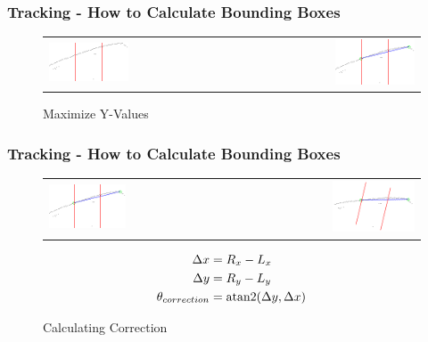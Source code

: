 \documentclass[nosymbols]{beamer}	%
\begin{document}
\begin{frame}
\frametitle{Tracking - How to Calculate Bounding Boxes}
\begin{figure}[!ht]
\caption{Maximize Y-Values}
\begin{tabular}{ l r }
 \includegraphics[width=0.45\textwidth,height=0.7\textheight,keepaspectratio]{bilder/obst_devide.png} &
 \includegraphics[width=0.45\textwidth,height=0.7\textheight,keepaspectratio]{bilder/obst_devide_angle.png}
\end{tabular}
\label{segments}
\end{figure}
\end{frame}

\begin{frame}
\frametitle{Tracking - How to Calculate Bounding Boxes}
\begin{figure}[!ht]
\caption{Calculating Correction}
\begin{tabular}{ l r }
 \includegraphics[width=0.45\textwidth,height=0.7\textheight,keepaspectratio]{bilder/obst_devide_angle.png} &
 \includegraphics[width=0.45\textwidth,height=0.7\textheight,keepaspectratio]{bilder/obst_devide_angle_rot.png}
\end{tabular}
\begin{align*}
\Delta x &= R_x - L_x\\
\Delta y &= R_y - L_y\\
\theta_{correction} &= \operatorname{atan2}(\Delta y,\Delta x)
\end{align*}
\label{segments}
\end{figure}
\end{frame}
\end{document}
